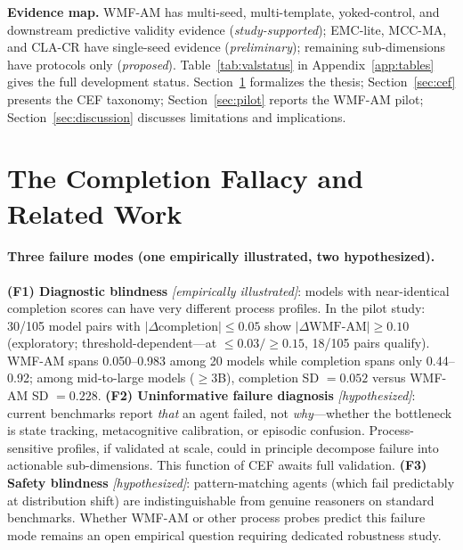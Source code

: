 \documentclass{article}
\begin{document}
\textbf{Evidence map.} WMF-AM has multi-seed, multi-template,
yoked-control, and downstream predictive validity evidence
(\emph{study-supported}); EMC-lite, MCC-MA, and CLA-CR have single-seed
evidence (\emph{preliminary}); remaining sub-dimensions have protocols only
(\emph{proposed}).
Table~\ref{tab:valstatus} in Appendix~\ref{app:tables} gives the full
development status. Section~\ref{sec:fallacy} formalizes the thesis;
Section~\ref{sec:cef} presents the CEF taxonomy;
Section~\ref{sec:pilot} reports the WMF-AM pilot;
Section~\ref{sec:discussion} discusses limitations and implications.

\section{The Completion Fallacy and Related Work}
\label{sec:fallacy}

\paragraph{Three failure modes (one empirically illustrated, two hypothesized).}
\textbf{(F1) Diagnostic blindness} \emph{[empirically illustrated]}: models
with near-identical completion scores can have very different process profiles.
In the pilot study: 30/105 model pairs with $|\Delta\text{completion}| \leq 0.05$
show $|\Delta\text{WMF-AM}| \geq 0.10$ (exploratory; threshold-dependent---at
$\leq 0.03 / \geq 0.15$, 18/105 pairs qualify). WMF-AM spans 0.050--0.983 among
20 models while completion spans only 0.44--0.92; among mid-to-large models
($\geq$3B), completion SD $= 0.052$ versus WMF-AM SD $= 0.228$.
\textbf{(F2) Uninformative failure diagnosis} \emph{[hypothesized]}: current
benchmarks report \emph{that} an agent failed, not \emph{why}---whether the
bottleneck is state tracking, metacognitive calibration, or episodic confusion.
Process-sensitive profiles, if validated at scale, could in principle decompose
failure into actionable sub-dimensions. This function of CEF awaits full validation.
\textbf{(F3) Safety blindness} \emph{[hypothesized]}: pattern-matching agents
(which fail predictably at distribution shift) are indistinguishable from genuine
reasoners on standard benchmarks. Whether WMF-AM or other process probes predict
this failure mode remains an open empirical question requiring dedicated robustness study.
\end{document}
